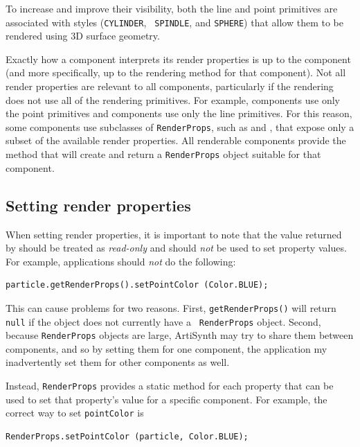 To increase and improve their visibility, both the line and point
primitives are associated with styles ({\tt CYLINDER}, {\tt
SPINDLE}, and {\tt SPHERE}) that allow them to be rendered using 3D
surface geometry.

Exactly how a component interprets its render properties is up to the
component (and more specifically, up to the rendering method for that
component).  Not all render properties are relevant to all components,
particularly if the rendering does not use all of the rendering
primitives. For example,
 components use only
the point primitives and
 components use only
the line primitives. For this reason, some components use subclasses
of {\tt RenderProps}, such as
 and
, that expose only a subset
of the available render properties. All renderable components provide
the method
 that
will create and return a {\tt RenderProps} object suitable for that
component.

\subsection{Setting render properties}
\label{SettingRenderProperties:sec}

When setting render properties, it is important to note that
the value returned by
should be treated as {\it read-only} and should {\it not}
be used to set property values.
For example, applications should {\it not} do the
following:
\begin{lstlisting}[]
   particle.getRenderProps().setPointColor (Color.BLUE);
\end{lstlisting}
%
This can cause problems for two reasons. First, {\tt getRenderProps()}
will return {\tt null} if the object does not currently have a {\tt
RenderProps} object. Second, because {\tt RenderProps} objects are
large, ArtiSynth may try to share them between components, and so by
setting them for one component, the application my inadvertently set
them for other components as well.

Instead, {\tt RenderProps} provides a static method for each property
that can be used to set that property's value for a specific
component.  For example, the correct way to set {\tt pointColor} is
%
\begin{lstlisting}[]
   RenderProps.setPointColor (particle, Color.BLUE);
\end{lstlisting}
%

